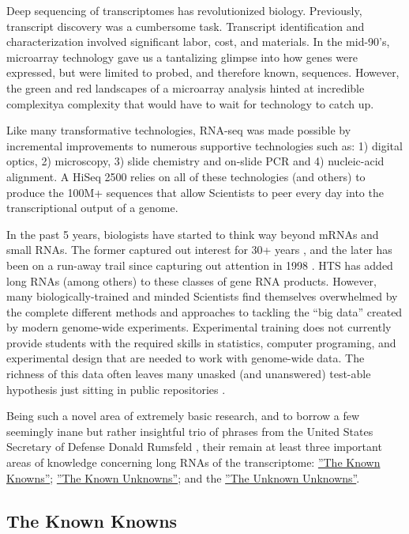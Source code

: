 Deep sequencing of transcriptomes has revolutionized biology. Previously, transcript discovery was a cumbersome task. Transcript identification and characterization involved significant labor, cost, and materials. In the mid-90's, microarray technology \citep{Schena1995a} gave us a tantalizing glimpse into how genes were expressed, but were limited to probed, and therefore known, sequences. However, the green and red landscapes of a microarray analysis hinted at incredible complexity\textemdash a complexity that would have to wait for technology to catch up.

Like many transformative technologies, RNA-seq was made possible by incremental improvements to numerous supportive technologies such as: 1) digital optics, 2) microscopy, 3) slide chemistry and on-slide PCR and 4) nucleic-acid alignment. A HiSeq 2500 relies on all of these technologies (and others) to produce the 100M+ sequences that allow Scientists to peer every day into the transcriptional output of a genome.

In the past 5 years, biologists have started to think way beyond mRNAs and small RNAs. The former captured out interest for 30+ years \citep{Furuichi1975,Wei1975}, and the later has been on a run-away trail since capturing out attention in 1998 \citep{Fire1998}. HTS has added long RNAs (among others) to these classes of gene RNA products. However, many biologically-trained and minded Scientists find themselves overwhelmed by the complete different methods and approaches to tackling the ``big data'' created by modern genome-wide experiments. Experimental training does not currently provide students with the required skills in statistics, computer programing, and experimental design that are needed to work with genome-wide data. The richness of this data often leaves many unasked (and unanswered) test-able hypothesis just sitting in public repositories \citep{Plocik2013}.

Being such a novel area of extremely basic research, and to borrow a few seemingly inane but rather insightful trio of phrases from the United States Secretary of Defense Donald Rumsfeld \citep{Rumsfeld2011}, their remain at least three important areas of knowledge concerning long RNAs of the transcriptome: 
\hyperref[subsec: The Known Knowns]{''The Known Knowns''}; 
\hyperref[subsec: The Known Unknowns]{''The Known Unknowns''}; 
and the \hyperref[subsec: The Unknown Unknowns]{''The Unknown Unknowns''}.

\subsection{The Known Knowns}\label{subsec: The Known Knowns}

